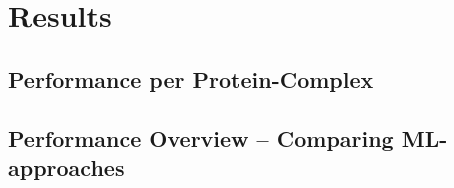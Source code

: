 \chapter{Results}
\label{cha:Results}


\section{Performance per Protein-Complex}


\section{Performance Overview -- Comparing ML-approaches}
